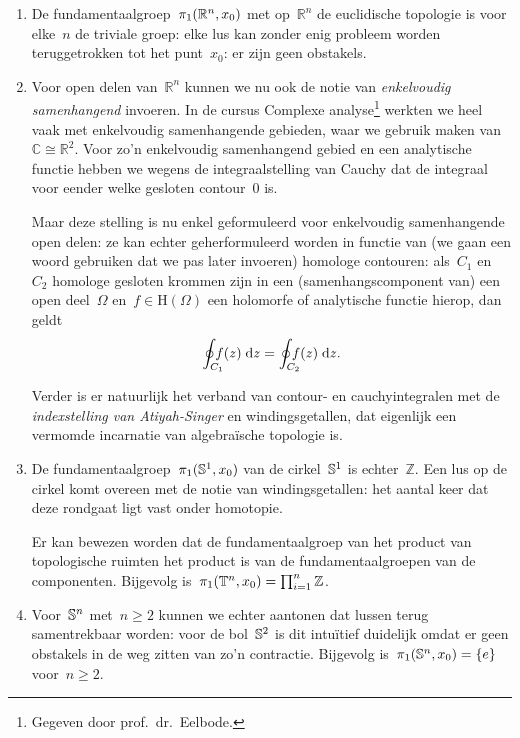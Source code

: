 \documentclass[a4paper,11pt,openany,oneside,article]{memoir}
\begin{document}
\begin{example}
  \begin{enumerate}
    \item De fundamentaalgroep~$\pi_1(\mathbb{R}^n,x_0)$ met op~$\mathbb{R}^n$ de euclidische topologie is voor elke~$n$ de triviale groep: elke lus kan zonder enig probleem worden teruggetrokken tot het punt~$x_0$: er zijn geen obstakels.

    \item Voor open delen van~$\mathbb{R}^n$ kunnen we nu ook de notie van \emph{enkelvoudig samenhangend} invoeren. In de cursus Complexe analyse\footnote{Gegeven door prof.~dr.~Eelbode.} werkten we heel vaak met enkelvoudig samenhangende gebieden, waar we gebruik maken van~$\mathbb{C}\cong\mathbb{R}^2$. Voor zo'n enkelvoudig samenhangend gebied en een analytische functie hebben we wegens de integraalstelling van Cauchy dat de integraal voor eender welke gesloten contour~$0$ is.

      Maar deze stelling is nu enkel geformuleerd voor enkelvoudig samenhangende open delen: ze kan echter geherformuleerd worden in functie van (we gaan een woord gebruiken dat we pas later invoeren) homologe contouren: als~$C_1$ en~$C_2$ homologe gesloten krommen zijn in een (samenhangscomponent van) een open deel~$\Omega$ en~$f\in\mathrm{H}(\Omega)$ een holomorfe of analytische functie hierop, dan geldt
      \begin{equation}
        \oint_{\mathrlap{C_1}}\,f(z)\;\mathrm{d}z=\oint_{\mathrlap{C_2}}\,f(z)\;\mathrm{d}z.
      \end{equation}

      Verder is er natuurlijk het verband van contour- en cauchyintegralen met de \emph{indexstelling van Atiyah-Singer} en windingsgetallen, dat eigenlijk een vermomde incarnatie van algebra\"ische topologie is.

    \item De fundamentaalgroep~$\pi_1(\mathbb{S}^1,x_0)$ van de cirkel~$\mathbb{S}^1$ is echter~$\mathbb{Z}$. Een lus op de cirkel komt overeen met de notie van windingsgetallen: het aantal keer dat deze rondgaat ligt vast onder homotopie.

      Er kan bewezen worden dat de fundamentaalgroep van het product van topologische ruimten het product is van de fundamentaalgroepen van de componenten. Bijgevolg is~$\pi_1(\mathbb{T}^n,x_0)=\prod_{i=1}^n\mathbb{Z}$.

    \item Voor~$\mathbb{S}^n$ met~$n\geq 2$ kunnen we echter aantonen dat lussen terug samentrekbaar worden: voor de bol~$\mathbb{S}^2$ is dit intu\"itief duidelijk omdat er geen obstakels in de weg zitten van zo'n contractie. Bijgevolg is~$\pi_1(\mathbb{S}^n,x_0)=\left\{ e \right\}$ voor~$n\geq 2$.


\end{enumerate}
\end{example}
\end{document}

